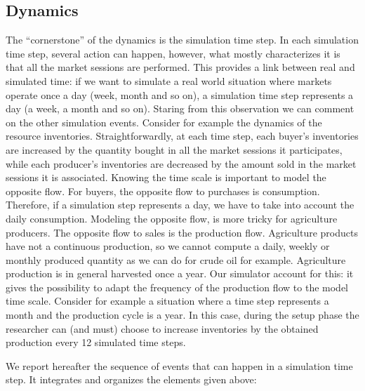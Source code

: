 \documentclass{article}
\begin{document}
\subsection{Dynamics}

The ``cornerstone'' of the dynamics is the simulation time step. In each simulation time step, several action can happen, however, what mostly characterizes it is that all the market sessions are performed.  
This provides a link between real and simulated time: if we want to simulate a real world situation where markets operate once a day (week, month and so on), a simulation time step represents a day (a week, a month and so on). Staring from this observation we can comment on the other simulation events. 
Consider for example the dynamics of the resource inventories. Straightforwardly, at each time step, each buyer's inventories are increased by the quantity bought in all the market sessions it participates, while each producer's inventories are decreased by the amount sold in the market sessions it is associated. Knowing the time scale is important to model the opposite flow. For buyers, the opposite flow to purchases is consumption. Therefore, if a simulation step represents a day, we have to take into account the daily consumption. Modeling the opposite flow, is more tricky for agriculture producers. The opposite flow to sales is the production flow. Agriculture products have not a continuous production, so we cannot compute a daily, weekly or monthly produced quantity as we can do for crude oil for example. Agriculture production is in general harvested once a year. Our simulator account for this: it gives the possibility to adapt the frequency of the production flow to the model time scale. Consider for example a situation where a time step represents a month and the production cycle is a year. In this case, during the setup phase the researcher can (and must) choose to increase inventories by the obtained production every 12 simulated time steps.   

We report hereafter the sequence of events that can happen in a simulation time step. It integrates and organizes the elements given above: 
\end{document}
